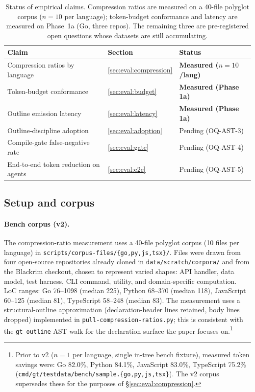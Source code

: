 \begin{table}[ht]
\centering
\caption{Status of empirical claims. Compression ratios are measured
  on a 40-file polyglot corpus ($n{=}10$ per language); token-budget
  conformance and latency are measured on Phase~1a (Go, three repos).
  The remaining three are pre-registered open questions whose datasets
  are still accumulating.}
\label{tab:eval-status}
\small
\begin{tabular}{lll}
\toprule
\textbf{Claim} & \textbf{Section} & \textbf{Status} \\
\midrule
Compression ratios by language        & \cref{sec:eval:compression}  & \textbf{Measured ($n{=}10$/lang)} \\
Token-budget conformance              & \cref{sec:eval:budget}       & \textbf{Measured (Phase 1a)} \\
Outline emission latency              & \cref{sec:eval:latency}      & \textbf{Measured (Phase 1a)} \\
Outline-discipline adoption           & \cref{sec:eval:adoption}     & Pending (OQ-AST-3) \\
Compile-gate false-negative rate      & \cref{sec:eval:gate}         & Pending (OQ-AST-4) \\
End-to-end token reduction on agents  & \cref{sec:eval:e2e}          & Pending (OQ-AST-5) \\
\bottomrule
\end{tabular}
\end{table}

\subsection{Setup and corpus}
\label{sec:eval:setup}

\paragraph{Bench corpus (v2).}
The compression-ratio measurement uses a 40-file polyglot corpus
(10 files per language) in \texttt{scripts/corpus-files/\{go,py,js,tsx\}/}.
Files were drawn from four open-source repositories already cloned in
\texttt{data/scratch/corpora/} and from the Blackrim checkout, chosen
to represent varied shapes: API handler, data model, test harness, CLI
command, utility, and domain-specific computation.
LoC ranges: Go 76--1098 (median 225), Python 68--370 (median 118),
JavaScript 60--125 (median 81), TypeScript 58--248 (median 83).
The measurement uses a structural-outline approximation
(declaration-header lines retained, body lines dropped) implemented in
\texttt{pull-compression-ratios.py}; this is consistent with the
\texttt{gt outline} AST walk for the declaration surface the paper
focuses on.\footnote{Prior to v2 ($n{=}1$ per language, single in-tree
bench fixture), measured token savings were: Go 82.0\%, Python 84.1\%,
JavaScript 83.0\%, TypeScript 75.2\%
(\texttt{cmd/gt/testdata/bench/sample.\{go,py,js,tsx\}}). The v2 corpus
supersedes these for the purposes of §\ref{sec:eval:compression}.}

